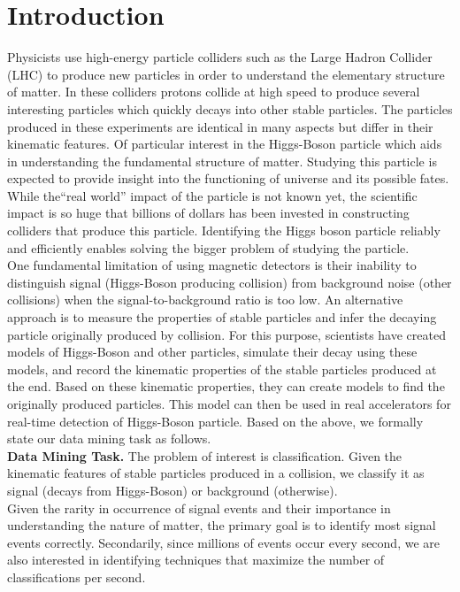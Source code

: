 \section{Introduction}
\label{sec:introduction}

Physicists use high-energy particle colliders such as the Large Hadron Collider (LHC) to produce new particles in order to understand the elementary structure of matter. In these colliders protons collide at high speed to produce several interesting particles which quickly decays into other stable particles. The particles produced in these experiments are identical in many aspects but differ in their kinematic features. Of particular interest in the Higgs-Boson particle which aids in understanding the fundamental structure of matter. Studying this particle is expected to provide insight into the functioning of universe and its possible fates. While the``real world'' impact of the particle is not known yet, the scientific impact is so huge that billions of dollars has been invested in constructing colliders that produce this particle. Identifying the Higgs boson particle reliably and efficiently enables solving the bigger problem of studying the particle. \\

One fundamental limitation of using magnetic detectors is their inability to distinguish signal (Higgs-Boson producing collision) from background noise (other collisions) when the signal-to-background ratio is too low. An alternative approach is to measure the properties of stable particles and infer the decaying particle originally produced by collision. For this purpose, scientists have created models of Higgs-Boson and other particles, simulate their decay using these models, and record the kinematic properties of the stable particles produced at the end. Based on these kinematic properties, they can create models to find the originally produced particles. This model can then be used in real accelerators for real-time detection of Higgs-Boson particle. Based on the above, we formally state our data mining task as follows.\\

\textbf{Data Mining Task.} The problem of interest is classification. Given the kinematic features of stable particles produced in a collision, we classify it as signal (decays from Higgs-Boson) or background (otherwise).\\

Given the rarity in occurrence of signal events and their importance in understanding the nature of matter, the primary goal is to identify most signal events correctly. Secondarily, since millions of events occur every second, we are also interested in identifying techniques that maximize the number of classifications per second. \\

